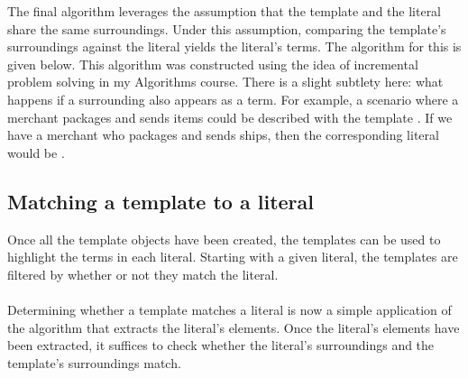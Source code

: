 \documentclass[../main.tex]{subfiles}
\begin{document}
The final algorithm leverages the assumption that the template and the literal share the same surroundings. Under this assumption, comparing the template's surroundings against the literal yields the literal's terms. The algorithm for this is given below.
This algorithm was constructed using the idea of incremental problem solving in my Algorithms course.
There is a slight subtlety here: what happens if a surrounding also appears as a term. For example, a scenario where a merchant packages and sends items could be described with the template . If we have a merchant who packages and sends ships, then the corresponding literal would be .

\subsection{Matching a template to a literal}
Once all the template objects have been created, the templates can be used to highlight the terms in each literal. Starting with a given literal, the templates are filtered by whether or not they match the literal. 
\\
\\
Determining whether a template matches a literal is now a simple application of the algorithm that extracts the literal's elements. Once the literal's elements have been extracted, it suffices to check whether the literal's surroundings and the template's surroundings match.
\end{document}
